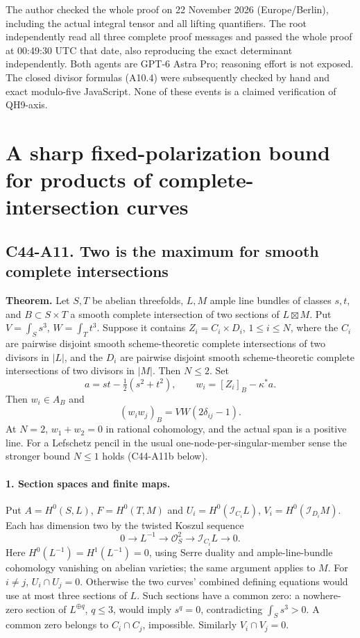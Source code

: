 \documentclass[11pt]{article}
\theoremstyle{remark}\newtheorem{remark}[theorem]{Remark}
\begin{document}
The author checked the whole proof on 22 November 2026
(Europe/Berlin), including the actual integral tensor and all
lifting quantifiers. The root independently read all three
complete proof messages and passed the whole proof at 00:49:30 UTC
that date, also reproducing the exact determinant independently.
Both agents are GPT-6 Astra Pro; reasoning effort is not exposed.
The closed divisor formulas (A10.4) were subsequently checked by
hand and exact modulo-five JavaScript. None of these events is
a claimed verification of QH9-axis.


\section{A sharp fixed-polarization bound for products of complete-intersection curves}
\subsection*{C44-A11. Two is the maximum for smooth complete intersections}

\textbf{Theorem.}
Let $S,T$ be abelian threefolds, $L,M$ ample line bundles of
classes $s,t$, and $B\subset S\times T$ a smooth complete
intersection of two sections of $L\boxtimes M$. Put
$V=\int_Ss^3$, $W=\int_Tt^3$.
Suppose it contains $Z_i=C_i\times D_i$, $1\le i\le N$,
where the $C_i$ are pairwise disjoint smooth scheme-theoretic
complete intersections of two divisors in $|L|$, and the $D_i$
are pairwise disjoint smooth scheme-theoretic complete
intersections of two divisors in $|M|$. Then $N\le2$.
Set
\[
 a=st-\tfrac12(s^2+t^2),\qquad w_i=[Z_i]_B-\kappa^*a.           \tag{A11.1}
\]
Then $w_i\in A_B$ and
\[
                         (w_iw_j)_B=VW(2\delta_{ij}-1).       \tag{A11.2}
\]
At $N=2$, $w_1+w_2=0$ in rational cohomology, and the actual
span is a positive line. For a Lefschetz pencil in the usual
one-node-per-singular-member sense the stronger bound $N\le1$
holds (C44-A11b below).

\paragraph{1. Section spaces and finite maps.}
Put $A=H^0(S,L)$, $F=H^0(T,M)$ and
$U_i=H^0(\mathcal I_{C_i}L)$, $V_i=H^0(\mathcal I_{D_i}M)$.
Each has dimension two by the twisted Koszul sequence
\[
 0\longrightarrow L^{-1}\longrightarrow\mathcal O_S^2
                     \longrightarrow\mathcal I_{C_i}L\longrightarrow0.
\]
Here $H^0(L^{-1})=H^1(L^{-1})=0$, using Serre duality and
ample-line-bundle cohomology vanishing on abelian varieties;
the same argument applies to $M$.
For $i\ne j$, $U_i\cap U_j=0$. Otherwise the two curves'
combined defining equations would use at most three sections
of $L$. Such sections have a common zero: a nowhere-zero
section of $L^{\oplus q}$, $q\le3$, would imply $s^q=0$,
contradicting $\int_Ss^3>0$. A common zero belongs to
$C_i\cap C_j$, impossible. Similarly $V_i\cap V_j=0$.
\end{document}
